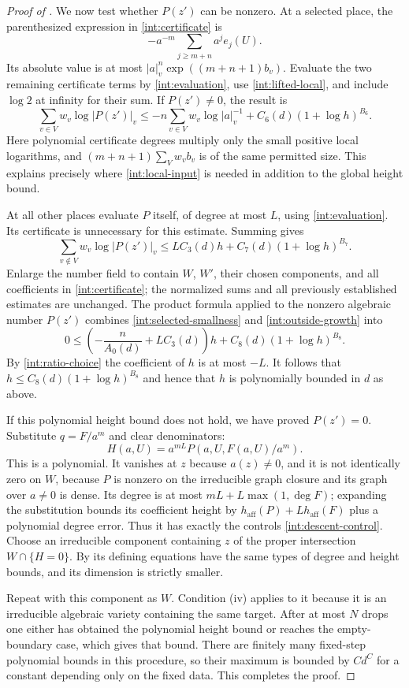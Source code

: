 \begin{proof}[Proof of ]
We now test whether $P(z')$ can be nonzero.  At a selected place, the
parenthesized expression in \eqref{int:certificate} is
\[
 -a^{-m}\sum_{j\geq m+n}a^je_j(U).
\]
Its absolute value is at most
$|a|_v^n\exp((m+n+1)b_v)$.  Evaluate the two remaining certificate
terms by \eqref{int:evaluation}, use
\eqref{int:lifted-local}, and include $\log2$ at infinity for their
sum.  If $P(z')\ne0$, the result is
\begin{equation}\label{int:selected-smallness}
 \sum_{v\in V}w_v\log|P(z')|_v
 \leq -n\sum_{v\in V}w_v\log|a|_v^{-1}
          +C_6(d)(1+\log h)^{B_6}.
\end{equation}
Here polynomial certificate degrees multiply only the small positive
local logarithms, and $(m+n+1)\sum_Vw_vb_v$ is of the same permitted
size.  This explains precisely where
\eqref{int:local-input} is needed in addition to the global height
bound.

At all other places evaluate $P$ itself, of degree at most $L$,
using \eqref{int:evaluation}.  Its certificate is unnecessary for
this estimate.  Summing gives
\begin{equation}\label{int:outside-growth}
 \sum_{v\notin V}w_v\log|P(z')|_v
   \leq L C_3(d)h+C_7(d)(1+\log h)^{B_7}.
\end{equation}
Enlarge the number field to contain $W$, $W'$, their chosen
components, and all coefficients in \eqref{int:certificate}; the
normalized sums and all previously established estimates are
unchanged.  The product formula applied to the nonzero algebraic
number $P(z')$ combines \eqref{int:selected-smallness} and
\eqref{int:outside-growth} into
\[
 0\leq\left(-\frac n{A_0(d)}+LC_3(d)\right)h
                   +C_8(d)(1+\log h)^{B_8}.
\]
By \eqref{int:ratio-choice} the coefficient of $h$ is at most $-L$.
It follows that $h\leq C_8(d)(1+\log h)^{B_8}$ and hence that $h$
is polynomially bounded in $d$ as above.

If this polynomial height bound does not hold, we have proved
$P(z')=0$.  Substitute $q=F/a^m$ and clear denominators:
\[
 H(a,U)=a^{mL}P(a,U,F(a,U)/a^m).
\]
This is a polynomial.  It vanishes at $z$ because $a(z)\ne0$, and
it is not identically zero on $W$, because $P$ is nonzero on the
irreducible graph closure and its graph over $a\ne0$ is dense.
Its degree is at most $mL+L\max(1,\deg F)$; expanding the
substitution bounds its coefficient height by
$h_{\mathrm{aff}}(P)+Lh_{\mathrm{aff}}(F)$ plus a polynomial degree
error.  Thus it has exactly the controls
\eqref{int:descent-control}.  Choose an irreducible component
containing $z$ of the proper intersection $W\cap\{H=0\}$.
By  its defining equations have the same types of
degree and height bounds, and its dimension is strictly smaller.

Repeat with this component as $W$.  Condition \textup{(iv)} applies
to it because it is an irreducible algebraic variety containing the
same target.  After at most $N$ drops one either has obtained the
polynomial height bound or reaches the empty-boundary case, which
gives that bound.  There are finitely many fixed-step polynomial
bounds in this procedure, so their maximum is bounded by $Cd^C$
for a constant depending only on the fixed data.  This completes
the proof.
\end{proof}
